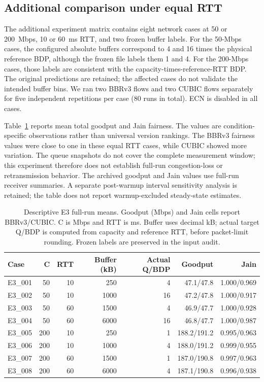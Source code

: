 \subsection{Additional comparison under equal RTT}
The additional experiment matrix contains eight network cases at 50 or
200~Mbps, 10 or 60~ms RTT, and two frozen buffer labels.
For the 50-Mbps cases, the configured absolute buffers correspond
to 4 and 16 times the physical reference BDP, although the frozen file
labels them 1 and 4. For the 200-Mbps cases, those labels are consistent
with the capacity-times-reference-RTT BDP. The original predictions
are retained; the affected cases do not validate the intended buffer bins. We ran two BBRv3 flows
and two CUBIC flows separately for five independent repetitions per case
(80 runs in total). ECN is disabled in all cases.

Table~\ref{tab:e3_candidate} reports mean total goodput and Jain fairness.
The values are condition-specific observations rather than universal
version rankings. The BBRv3 fairness values were close to one in these equal
RTT cases, while CUBIC showed more variation. The queue snapshots do not cover the complete measurement window;
this experiment therefore does not establish full-run congestion-loss
or retransmission behavior.
The archived goodput and Jain values use full-run receiver summaries.
A separate post-warmup interval sensitivity analysis is retained;
the table does not report warmup-excluded steady-state estimates.

\begin{table}[htbp]
\centering
\caption{Descriptive E3 full-run means. Goodput (Mbps) and Jain cells report BBRv3/CUBIC. C is Mbps and RTT is ms. Buffer uses decimal kB; actual target Q/BDP is computed from capacity and reference RTT, before packet-limit rounding. Frozen labels are preserved in the input audit.}
\label{tab:e3_candidate}
\begin{tabular}{lrrrrrr}
\toprule
Case & C & RTT & Buffer (kB) & Actual Q/BDP & Goodput & Jain \\
\midrule
E3\_001 & 50 & 10 & 250 & 4 & 47.1/47.8 & 1.000/0.969 \\
E3\_002 & 50 & 10 & 1000 & 16 & 47.2/47.8 & 1.000/0.917 \\
E3\_003 & 50 & 60 & 1500 & 4 & 46.9/47.7 & 1.000/0.928 \\
E3\_004 & 50 & 60 & 6000 & 16 & 46.8/47.7 & 1.000/0.987 \\
E3\_005 & 200 & 10 & 250 & 1 & 188.2/191.2 & 0.995/0.963 \\
E3\_006 & 200 & 10 & 1000 & 4 & 188.0/191.2 & 0.999/0.955 \\
E3\_007 & 200 & 60 & 1500 & 1 & 187.0/190.8 & 0.997/0.963 \\
E3\_008 & 200 & 60 & 6000 & 4 & 187.1/190.8 & 0.996/0.938 \\
\bottomrule
\end{tabular}
\end{table}
